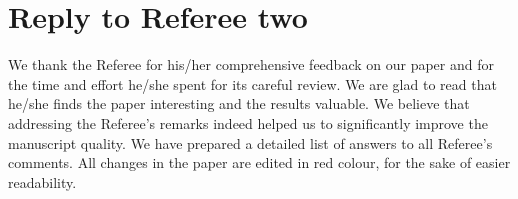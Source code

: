\documentclass[12pt,english]{article}
\begin{document}

\section*{Reply to Referee two}

We thank the Referee for his/her comprehensive feedback on our paper 
and for the time and effort he/she spent for its careful review. 
We are glad to read that he/she finds the paper interesting and the results valuable. We believe that addressing the Referee's remarks
indeed helped us to significantly improve the manuscript quality.
We have prepared a detailed list of answers to all Referee's comments. 
All changes in the paper are edited in red colour, for the sake 
of easier readability. 
 
\end{document}
